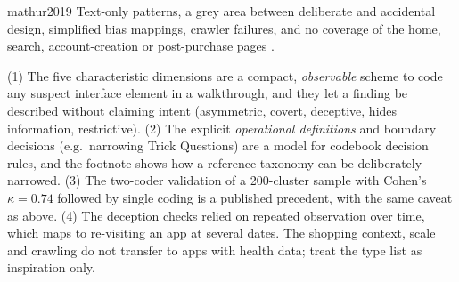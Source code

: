 \begin{papercard}{mathur2019}
 Text-only patterns, a grey area between deliberate and accidental design, simplified bias mappings, crawler failures, and no coverage of the home, search, account-creation or post-purchase pages .

 (1) The five characteristic dimensions are a compact, \emph{observable} scheme to code any suspect interface element in a walkthrough, and they let a finding be described without claiming intent (asymmetric, covert, deceptive, hides information, restrictive). (2) The explicit \emph{operational definitions} and boundary decisions (e.g.\ narrowing Trick Questions) are a model for codebook decision rules, and the footnote shows how a reference taxonomy can be deliberately narrowed. (3) The two-coder validation of a 200-cluster sample with Cohen's $\kappa=0.74$ followed by single coding is a published precedent, with the same caveat as above. (4) The deception checks relied on repeated observation over time, which maps to re-visiting an app at several dates. The shopping context, scale and crawling do not transfer to apps with health data; treat the type list as inspiration only.
\end{papercard}
